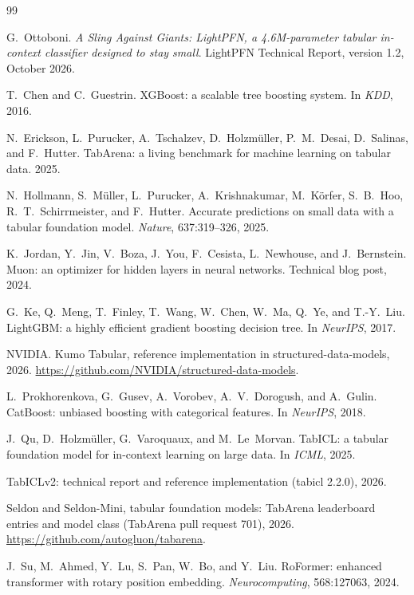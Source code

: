 \documentclass[11pt]{article}
\begin{document}
\begin{thebibliography}{99}

G.~Ottoboni.
\newblock \emph{A Sling Against Giants: LightPFN, a 4.6M-parameter tabular in-context classifier designed to stay small}.
\newblock LightPFN Technical Report, version 1.2, October 2026.

 T.~Chen and C.~Guestrin. XGBoost: a scalable tree boosting system. In
\emph{KDD}, 2016.

 N.~Erickson, L.~Purucker, A.~Tschalzev, D.~Holzm\"uller, P.~M.~Desai,
D.~Salinas, and F.~Hutter. TabArena: a living benchmark for machine learning on tabular data. 2025.

 N.~Hollmann, S.~M\"uller, L.~Purucker, A.~Krishnakumar, M.~K\"orfer,
S.~B.~Hoo, R.~T.~Schirrmeister, and F.~Hutter. Accurate predictions on small data with a tabular
foundation model. \emph{Nature}, 637:319--326, 2025.

 K.~Jordan, Y.~Jin, V.~Boza, J.~You, F.~Cesista, L.~Newhouse, and J.~Bernstein.
Muon: an optimizer for hidden layers in neural networks. Technical blog post, 2024.

 G.~Ke, Q.~Meng, T.~Finley, T.~Wang, W.~Chen, W.~Ma, Q.~Ye, and T.-Y.~Liu. LightGBM:
a highly efficient gradient boosting decision tree. In \emph{NeurIPS}, 2017.

 NVIDIA. Kumo Tabular, reference implementation in structured-data-models, 2026.
\url{https://github.com/NVIDIA/structured-data-models}.

 L.~Prokhorenkova, G.~Gusev, A.~Vorobev, A.~V.~Dorogush, and A.~Gulin.
CatBoost: unbiased boosting with categorical features. In \emph{NeurIPS}, 2018.

 J.~Qu, D.~Holzm\"uller, G.~Varoquaux, and M.~Le~Morvan. TabICL: a tabular foundation
model for in-context learning on large data. In \emph{ICML}, 2025.

 TabICLv2: technical report and reference implementation (tabicl 2.2.0),
2026.

 Seldon and Seldon-Mini, tabular foundation models: TabArena leaderboard entries and
model class (TabArena pull request 701), 2026. \url{https://github.com/autogluon/tabarena}.

 J.~Su, M.~Ahmed, Y.~Lu, S.~Pan, W.~Bo, and Y.~Liu. RoFormer: enhanced transformer
with rotary position embedding. \emph{Neurocomputing}, 568:127063, 2024.

\end{thebibliography}
\end{document}

